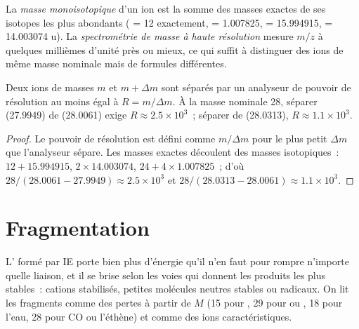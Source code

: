 \begin{definition}\label{def:b2:mass-spec-atomic:exact-mass}
La \emph{masse monoisotopique} d'un ion est la somme des masses exactes de
ses isotopes les plus abondants ( = 12 exactement,  = 1.007825,  = 15.994915,
 = 14.003074 u). La \emph{spectrométrie de masse à haute résolution}
mesure $m/z$ à quelques millièmes d'unité près ou mieux, ce qui suffit à distinguer des ions de même
masse nominale mais de formules différentes.
\end{definition}

\begin{proposition}\label{prop:b2:mass-spec-atomic:resolving}
Deux ions de masses $m$ et $m + \Delta m$ sont séparés par un analyseur de pouvoir de résolution au moins
égal à $R = m/\Delta m$. À la masse nominale 28, séparer  (27.9949) de  (28.0061) exige $R
\approx 2.5 \times 10^3$~; séparer  de  (28.0313), $R \approx 1.1 \times 10^3$.
\end{proposition}

\begin{proof}
Le pouvoir de résolution est défini comme $m/\Delta m$ pour le plus petit $\Delta m$ que l'analyseur
sépare. Les masses exactes découlent des masses isotopiques~: $12 + 15.994915$, $2 \times 14.003074$, $24 + 4 \times
1.007825$~; d'où $28/(28.0061 - 27.9949) \approx 2.5 \times 10^3$ et $28/(28.0313 - 28.0061) \approx
1.1 \times 10^3$.
\end{proof}

\section{Fragmentation}

L' formé par IE porte bien plus d'énergie qu'il n'en faut pour rompre n'importe quelle
liaison, et il se brise selon les voies qui donnent les produits les plus stables~: cations stabilisés,
petites molécules neutres stables ou radicaux. On lit les fragments comme des pertes à partir de $M$ (15
pour , 29 pour  ou , 18
pour l'eau, 28 pour CO ou l'éthène) et comme des ions caractéristiques.


